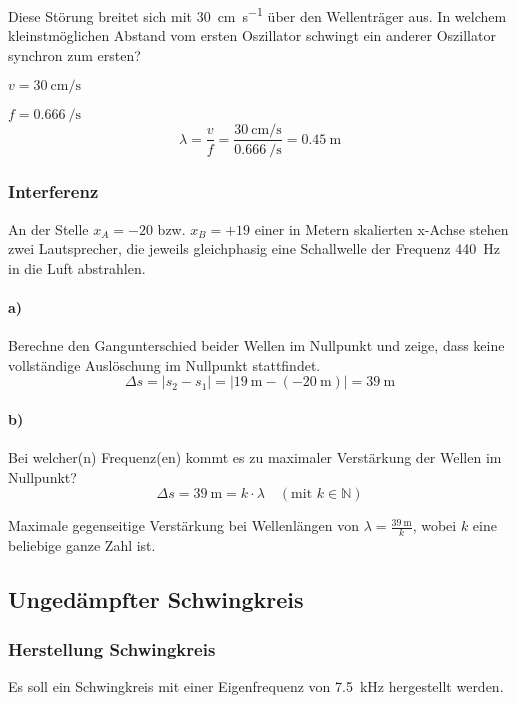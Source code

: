 \documentclass{ajc}
\begin{document}
	Diese Störung breitet sich mit \SI{30}{\cm\per\s} über den Wellenträger aus. In welchem kleinstmöglichen Abstand vom ersten Oszillator schwingt ein anderer Oszillator synchron zum ersten?
	
	$v = \SI{30}{\cm\per\s}$
	
	$f = \SI{0,666}{\per\s}$
	\begin{equation}
		\lambda = \frac{v}{f} = \frac{\SI{30}{\cm\per\s}}{\SI{0,666}{\per\s}} = \SI{0,45}{\m}
	\end{equation}
	
	\subsubsection{Interferenz}
	An der Stelle $x_A = -20$ bzw. $x_B = +19$ einer in Metern skalierten x-Achse stehen zwei Lautsprecher, die jeweils gleichphasig eine Schallwelle der Frequenz \SI{440}{\hertz} in die Luft abstrahlen.
	
	\paragraph{a)} Berechne den Gangunterschied beider Wellen im Nullpunkt und zeige, dass keine vollständige Auslöschung im Nullpunkt stattfindet.
	\begin{equation}
		\Delta s = \left|s_2 - s_1\right| = \left|\SI{19}{\m} - (\SI{-20}{\m})\right| = \SI{39}{\m}
	\end{equation}
	
	\paragraph{b)} Bei welcher(n) Frequenz(en) kommt es zu maximaler Verstärkung der Wellen im Nullpunkt? 
	\begin{equation}
		\Delta s = \SI{39}{\m} = k \cdot \lambda \quad (\text{mit } k \in \mathbb{N})
	\end{equation}
	
	Maximale gegenseitige Verstärkung bei Wellenlängen von $\lambda = \frac{\SI{39}{\m}}{k}$, wobei $k$ eine beliebige ganze Zahl ist.
	
	\subsection{Ungedämpfter Schwingkreis}
	
	\subsubsection{Herstellung Schwingkreis}
	Es soll ein Schwingkreis mit einer Eigenfrequenz von \SI{7,5}{\kilo\Hz} hergestellt werden.
	
\end{document}
